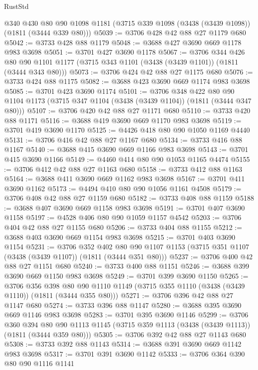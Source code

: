 \begin{lexlean}{RustStd}
\begin{coremodule}
    @340
    @430
    @80
    @90
    @1098
    @1181
    (@3715 @339 @1098 (@3438 (@3439 @1098)) (@1811 (@3444 @339 @80)))
@5039 := @3706 @428 @42 @88 @27 @1179 @680
@5042 := @3733 @428 @88 @1179
@5048 := @3688 @427 @3690 @669 @1178 @983 @3698
@5051 := @3701 @427 @3690 @1178
@5067 := @3706
    @344
    @426
    @80
    @90
    @1101
    @1177
    (@3715 @343 @1101 (@3438 (@3439 @1101)) (@1811 (@3444 @343 @80)))
@5073 := @3706 @424 @42 @88 @27 @1175 @680
@5076 := @3733 @424 @88 @1175
@5082 := @3688 @423 @3690 @669 @1174 @983 @3698
@5085 := @3701 @423 @3690 @1174
@5101 := @3706
    @348
    @422
    @80
    @90
    @1104
    @1173
    (@3715 @347 @1104 (@3438 (@3439 @1104)) (@1811 (@3444 @347 @80)))
@5107 := @3706 @420 @42 @88 @27 @1171 @680
@5110 := @3733 @420 @88 @1171
@5116 := @3688 @419 @3690 @669 @1170 @983 @3698
@5119 := @3701 @419 @3690 @1170
@5125 := @4426 @418 @80 @90 @1050 @1169 @4440
@5131 := @3706 @416 @42 @88 @27 @1167 @680
@5134 := @3733 @416 @88 @1167
@5140 := @3688 @415 @3690 @669 @1166 @983 @3698
@5143 := @3701 @415 @3690 @1166
@5149 := @4460 @414 @80 @90 @1053 @1165 @4474
@5155 := @3706 @412 @42 @88 @27 @1163 @680
@5158 := @3733 @412 @88 @1163
@5164 := @3688 @411 @3690 @669 @1162 @983 @3698
@5167 := @3701 @411 @3690 @1162
@5173 := @4494 @410 @80 @90 @1056 @1161 @4508
@5179 := @3706 @408 @42 @88 @27 @1159 @680
@5182 := @3733 @408 @88 @1159
@5188 := @3688 @407 @3690 @669 @1158 @983 @3698
@5191 := @3701 @407 @3690 @1158
@5197 := @4528 @406 @80 @90 @1059 @1157 @4542
@5203 := @3706 @404 @42 @88 @27 @1155 @680
@5206 := @3733 @404 @88 @1155
@5212 := @3688 @403 @3690 @669 @1154 @983 @3698
@5215 := @3701 @403 @3690 @1154
@5231 := @3706
    @352
    @402
    @80
    @90
    @1107
    @1153
    (@3715 @351 @1107 (@3438 (@3439 @1107)) (@1811 (@3444 @351 @80)))
@5237 := @3706 @400 @42 @88 @27 @1151 @680
@5240 := @3733 @400 @88 @1151
@5246 := @3688 @399 @3690 @669 @1150 @983 @3698
@5249 := @3701 @399 @3690 @1150
@5265 := @3706
    @356
    @398
    @80
    @90
    @1110
    @1149
    (@3715 @355 @1110 (@3438 (@3439 @1110)) (@1811 (@3444 @355 @80)))
@5271 := @3706 @396 @42 @88 @27 @1147 @680
@5274 := @3733 @396 @88 @1147
@5280 := @3688 @395 @3690 @669 @1146 @983 @3698
@5283 := @3701 @395 @3690 @1146
@5299 := @3706
    @360
    @394
    @80
    @90
    @1113
    @1145
    (@3715 @359 @1113 (@3438 (@3439 @1113)) (@1811 (@3444 @359 @80)))
@5305 := @3706 @392 @42 @88 @27 @1143 @680
@5308 := @3733 @392 @88 @1143
@5314 := @3688 @391 @3690 @669 @1142 @983 @3698
@5317 := @3701 @391 @3690 @1142
@5333 := @3706
    @364
    @390
    @80
    @90
    @1116
    @1141

\end{coremodule}
\end{lexlean}
